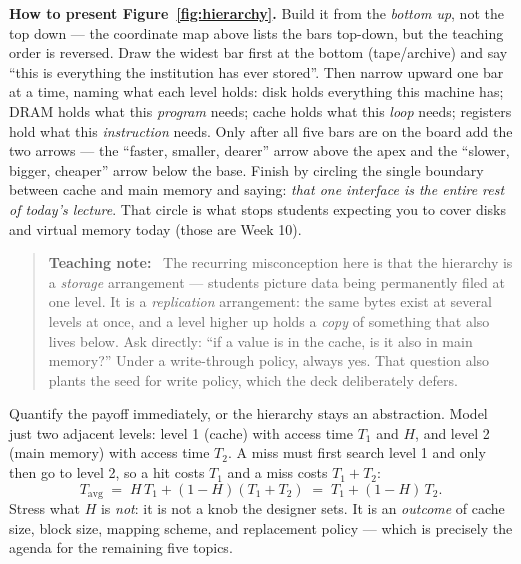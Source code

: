\documentclass[11pt]{article}
\newenvironment{teachingaside}{\begin{quote}\small\color{primary-gold}\textbf{Teaching note:}\ }{\end{quote}}
\begin{document}
\textbf{How to present Figure~\ref{fig:hierarchy}.} Build it from the \emph{bottom up}, not the top down --- the coordinate map above lists the bars top-down, but the teaching order is reversed. Draw the widest bar first at the bottom (tape/archive) and say ``this is everything the institution has ever stored''. Then narrow upward one bar at a time, naming what each level holds: disk holds everything this machine has; DRAM holds what this \emph{program} needs; cache holds what this \emph{loop} needs; registers hold what this \emph{instruction} needs. Only after all five bars are on the board add the two arrows --- the ``faster, smaller, dearer'' arrow above the apex and the ``slower, bigger, cheaper'' arrow below the base. Finish by circling the single boundary between cache and main memory and saying: \emph{that one interface is the entire rest of today's lecture}. That circle is what stops students expecting you to cover disks and virtual memory today (those are Week 10).

\begin{teachingaside}
The recurring misconception here is that the hierarchy is a \emph{storage} arrangement --- students picture data being permanently filed at one level. It is a \emph{replication} arrangement: the same bytes exist at several levels at once, and a level higher up holds a \emph{copy} of something that also lives below. Ask directly: ``if a value is in the cache, is it also in main memory?'' Under a write-through policy, always yes. That question also plants the seed for write policy, which the deck deliberately defers.
\end{teachingaside}

Quantify the payoff immediately, or the hierarchy stays an abstraction. Model just two adjacent levels: level 1 (cache) with access time $T_1$ and  $H$, and level 2 (main memory) with access time $T_2$. A miss must first search level 1 and only then go to level 2, so a hit costs $T_1$ and a miss costs $T_1 + T_2$:
\[
  T_{\text{avg}} \;=\; H\,T_1 + (1-H)(T_1 + T_2) \;=\; T_1 + (1-H)\,T_2 .
\]
Stress what $H$ is \emph{not}: it is not a knob the designer sets. It is an \emph{outcome} of cache size, block size, mapping scheme, and replacement policy --- which is precisely the agenda for the remaining five topics.
\end{document}
